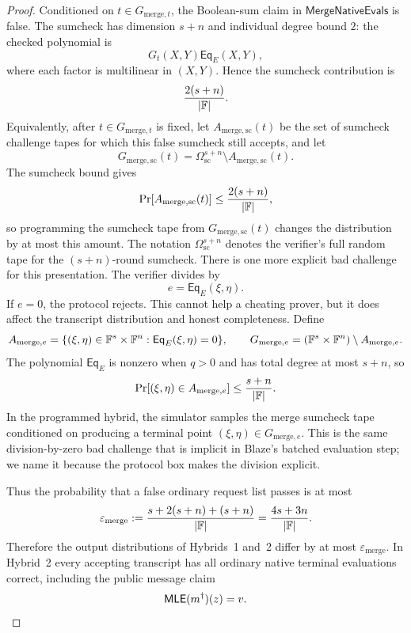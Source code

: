 \begin{proof}
Conditioned on \(t\in G_{\mathrm{merge},t}\), the Boolean-sum claim in
\(\mathsf{MergeNativeEvals}\) is false.  The sumcheck has dimension \(s+n\)
and individual degree bound \(2\): the checked polynomial is
\[
  G_t(X,Y)\mathsf{Eq}_E(X,Y),
\]
where each factor is multilinear in \((X,Y)\).  Hence the sumcheck contribution
is
\[
  \frac{2(s+n)}{|\mathbb{F}|}.
\]
Equivalently, after \(t\in G_{\mathrm{merge},t}\) is fixed, let
\(A_{\mathrm{merge},\mathrm{sc}}(t)\) be the set of sumcheck challenge tapes
for which this false sumcheck still accepts, and let
\[
  G_{\mathrm{merge},\mathrm{sc}}(t)
  =
  \Omega_{\mathrm{sc}}^{s+n}\setminus
  A_{\mathrm{merge},\mathrm{sc}}(t).
\]
The sumcheck bound gives
\[
  \Pr[A_{\mathrm{merge},\mathrm{sc}}(t)]\le \frac{2(s+n)}{|\mathbb{F}|},
\]
so programming the sumcheck tape from
\(G_{\mathrm{merge},\mathrm{sc}}(t)\) changes the distribution by at most this
amount.  The notation \(\Omega_{\mathrm{sc}}^{s+n}\) denotes the verifier's
full random tape for the \((s+n)\)-round sumcheck.
There is one more explicit bad challenge for this presentation.  The verifier
divides by
\[
  e=\mathsf{Eq}_E(\xi,\eta).
\]
If \(e=0\), the protocol rejects.  This cannot help a cheating prover, but it
does affect the transcript distribution and honest completeness.  Define
\[
  A_{\mathrm{merge},e}
  =
  \{(\xi,\eta)\in\mathbb{F}^s\times\mathbb{F}^n:
    \mathsf{Eq}_E(\xi,\eta)=0\},
  \qquad
  G_{\mathrm{merge},e}
  =
  (\mathbb{F}^s\times\mathbb{F}^n)\setminus A_{\mathrm{merge},e}.
\]
The polynomial \(\mathsf{Eq}_E\) is nonzero when \(q>0\) and has total degree
at most \(s+n\), so
\[
  \Pr[(\xi,\eta)\in A_{\mathrm{merge},e}]
  \le \frac{s+n}{|\mathbb{F}|}.
\]
In the programmed hybrid, the simulator samples the merge sumcheck tape
conditioned on producing a terminal point \((\xi,\eta)\in G_{\mathrm{merge},e}\).
This is the same division-by-zero bad challenge that is implicit in Blaze's
batched evaluation step; we name it because the protocol box makes the division
explicit.

Thus the probability that a false ordinary request list passes is at most
\[
  \varepsilon_{\mathrm{merge}}
  :=
  \frac{s+2(s+n)+(s+n)}{|\mathbb{F}|}
  =
  \frac{4s+3n}{|\mathbb{F}|}.
\]
Therefore the output distributions of Hybrids~1 and~2 differ by at most
\(\varepsilon_{\mathrm{merge}}\).  In Hybrid~2 every accepting transcript has
all ordinary native terminal evaluations correct, including the public message
claim
\[
  \mathsf{MLE}(m^\dagger)(z)=v.
\]


\end{proof}
